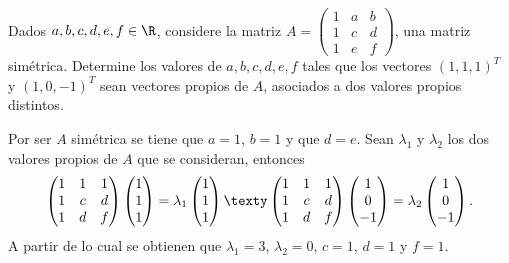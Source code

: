 \documentclass[10pt,a4]{examenEPN}
\begin{document}
\encabezado
\begin{preguntas}

\item Dados $a,b,c,d,e,f\in\R$, considere la matriz $A = \begin{pmatrix}1&a&b\\1&c&d\\1&e&f\end{pmatrix}$, una matriz simétrica. Determine los valores de $a,b,c,d,e,f$ tales que los vectores $(1,1,1)^{T}$ y $(1,0,-1)^{T}$ sean vectores propios de $A$, asociados a dos valores propios distintos.
    
\begin{respuesta}\hspace{0pt}

Por ser $A$ simétrica se tiene que $a = 1$, $b = 1$ y que $d = e$. Sean $\lambda_{1}$ y $\lambda_{2}$ los dos valores propios de $A$ que se consideran, entonces
\[
    \begin{pmatrix}1&1&1\\1&c&d\\1&d&f\end{pmatrix}\begin{pmatrix}1\\1\\1\end{pmatrix}=\lambda_{1}\begin{pmatrix}1\\1\\1\end{pmatrix}
    \texty
    \begin{pmatrix}1&1&1\\1&c&d\\1&d&f\end{pmatrix}\begin{pmatrix}1\\0\\-1\end{pmatrix}=\lambda_{2}\begin{pmatrix}1\\0\\-1\end{pmatrix}.
\]
A partir de lo cual se obtienen que $\lambda_{1}=3$, $\lambda_{2}=0$, $c=1$, $d=1$ y $f=1$.\qedhere
\end{respuesta}



\end{preguntas}
\end{document}
